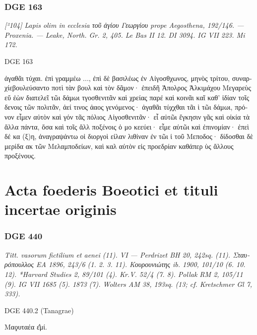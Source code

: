 \subsubsection{DGE 163}
\textit{[²104] Lapis olim in ecclesia \textgreek{τοῦ ἁγίου} Γεωργίου prope Aegosthena, 192/146. — Proxenia. — Leake, North. Gr. 2, 405. Le Bas II 12. DI 3094. IG VII 223. Mi 172.}
\begin{versi}{DGE 163}
\begin{greek}
ἀγαθᾶι τύχαι. ἐπὶ γραμμέω ..., {\verso[1]} ἐπὶ δὲ βασιλέως ἐν Αἰγοσθχωνος, μηνὸς τρίτου, συναρχίεβουλεύσαντο ποτὶ τὰν βουλ καὶ τὸν δᾶμον· ἐπειδῆ Ἀπολρος Ἀλκιμάχου Μεγαρεὺς εὔ {\verso} ἐὼν διατελεῖ τῶι δάμωι τγοσθενιτᾶν καὶ χρείας παρέ {\verso} καὶ κοινᾶι καῖ καθ’ ἱδίαν τοῖς δενοις τῶν πολιτᾶν, ἀεί τινος ἀαος γενόμενος· ἀγαθᾶι τύχχθαι τᾶι ὶ τῶι δάμωι, πρόνον εἶμεν αὐτὸν καὶ γόν {\verso} τᾶς πόλιος Αἰγοσθενιτᾶν· εἶ αὐτῶι ἔγκησιν γᾶς καὶ οἰκία {\verso} τὰ ἄλλα πάντα, ὅσα καὶ τοῖς ἄλλ {\verso} ποξένοις ὁ μο κεεύει· εἶμε {\verso} αὐτῶι καὶ ἐπινομίαν· ἐπεὶ δέ κα (ξ)η, ἀναγραψάντω οἱ διοργοὶ εἰλαν λιθίναν ἐν τῶι ἱ τοῦ Μεποδος· δίδοσθαι δὲ  μερίδα ακ τῶν Μελαμποδείων, καὶ καλ {\verso} αὐτὸν εἰς προεδρίαν καθάπερ ὺς ἄλλους προξένους.
\end{greek}
\end{versi}

\section{Acta foederis Boeotici et tituli incertae originis}

\subsubsection{DGE 440}
\textit{Titt. vasorum fictilium et aenei (11). VI — Perdrizet BH 20, 242sq. (11). \textgreek{Σταυρόπουλλος} EA 1896, 243/6 (1. 2. 3. 11).  \textgreek{Κουρουνιώτης} ib. 1900, 101/10 (6. 10. 12). *Harvard Studies 2, 89/101 (4). Kr.V. 52/4 (7. 8). Pollak RM 2, 105/11 (9). IG VII 1685 (5). 1873 (7). Wolters AM 38, 193sq. (13; cf. Kretschmer Gl 7, 333).}
\begin{versi}{DGE 440.2}
(Tanagrae)
\begin{greek}
Μαϙυταέα ε̄̓μί.
\end{greek}
\end{versi}

